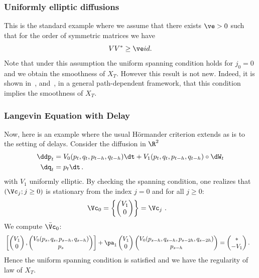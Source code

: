 \subsubsection{Uniformly elliptic diffusions}
This is the standard example where we assume that there exists $\ve>0$ such that for the order of symmetric matrices we have
\[
VV^*\geq \ve id.
\]
Note that under this assumption the uniform spanning condition holds for $j_0=0$ and we obtain the smoothness of $X_T$. However this result is not new. Indeed, it is shown in~\cite[Theorem~8.3]{ST83}, \cite{KS1984} and~\cite{bally2016pathwise}, in a general path-dependent framework, that this condition implies the smoothness of $X_T$.


\subsubsection{Langevin Equation with Delay}
Now, here is an example where the usual H\"ormander criterion extends as is to the setting of delays. Consider the diffusion in $\R^2$
\begin{align*}
\ddp_t & =V_0(p_t,q_t,p_{t-h},q_{t-h})\dt + V_1(p_t,q_t,p_{t-h},q_{t-h}) \circ \dW_t\\
\dq_t & =p_t \dt \, .
\end{align*}
with $V_1$ uniformly elliptic. By checking the spanning condition, one realizes that $\left(\Vc_j; j \geq 0 \right)$ is stationary from the index $j=0$ and for all $j \geq 0$:
\begin{align*}
& \Vc_0=\left\{
\begin{pmatrix}
V_1 \\
0
\end{pmatrix}\right\} = \Vc_j \ .
\end{align*}
We compute $\bar \Vc_0$:
\begin{align*}
& \left[\begin{pmatrix}
V_1 \\
0
\end{pmatrix},
\begin{pmatrix}
V_0 (p_s,q_s,p_{s-h},q_{s-h})\\
p_s
\end{pmatrix}\right] + \pa_1
\begin{pmatrix}
V_1 \\
0
\end{pmatrix} 
\begin{pmatrix}
V_0(p_{s-h},q_{s-h},p_{s-2h},q_{s-2h}) \\
p_{s-h}
\end{pmatrix} = 
\begin{pmatrix}
* \\
-V_1
\end{pmatrix}.
\end{align*}
Hence the uniform spanning condition is satisfied and we have the regularity of law of $X_T$.

